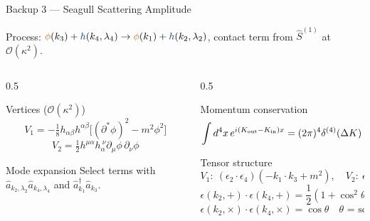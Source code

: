\documentclass[aspectratio=169]{beamer}
\begin{document}
\begin{frame}[c]{Backup 3 — Seagull Scattering Amplitude}

\small
Process: $\matt{\phi}(k_3)+\grav{h}(k_4,\lambda_4)\to\matt{\phi}(k_1)+\grav{h}(k_2,\lambda_2)$,
contact term from $\hat{S}^{(1)}$ at $\mathcal{O}(\kappa^2)$.

\vspace{0.2cm}

\begin{columns}[T,totalwidth=\textwidth]

\begin{column}{0.5\textwidth}

\begin{block}{Vertices ($\mathcal{O}(\kappa^2)$)}
\footnotesize
\[
V_1=-\tfrac{1}{8}h_{\alpha\beta}h^{\alpha\beta}
\big[(\partial^*\phi)^2-m^2\phi^2\big]\]\[
V_2=\tfrac12 h^{\mu\alpha}h_\alpha^{\ \nu}\partial_\mu\phi\,\partial_\nu\phi
\]
\end{block}

\vspace{0.2cm}

\begin{block}{Mode expansion}
\footnotesize
Select terms with
$\hat{a}_{k_2,\lambda_2}\hat{a}_{k_4,\lambda_4}$ and
$\hat{a}^\dagger_{k_1}\hat{a}_{k_3}$.

\end{block}

\end{column}

\begin{column}{0.5\textwidth}

\begin{block}{Momentum conservation}
\footnotesize
\[
\int d^4x\,e^{i(K_{\rm out}-K_{\rm in})x}
=(2\pi)^4\delta^{(4)}(\Delta K)
\]
\end{block}

\vspace{-0.2cm}
\begin{block}{Tensor structure}
\footnotesize
\[
V_1:\ (\epsilon_2\!\cdot\!\epsilon_4)(-k_1\!\cdot\!k_3+m^2),
\quad
V_2:\ \epsilon_{2}^{\mu\alpha}\epsilon_{4\alpha}^{\ \nu}k_{1\nu}k_{3\mu}
\]
\[
\epsilon(k_2,+)\cdot \epsilon(k_4,+)=\frac12(1+\cos^2\theta),\quad\]\[
\epsilon(k_2,\times)\cdot \epsilon(k_4,\times)=\cos\theta\quad \text{$\theta$ = scattering angle}
\]
\end{block}


\end{column}
\end{columns}
\end{frame}
\end{document}

